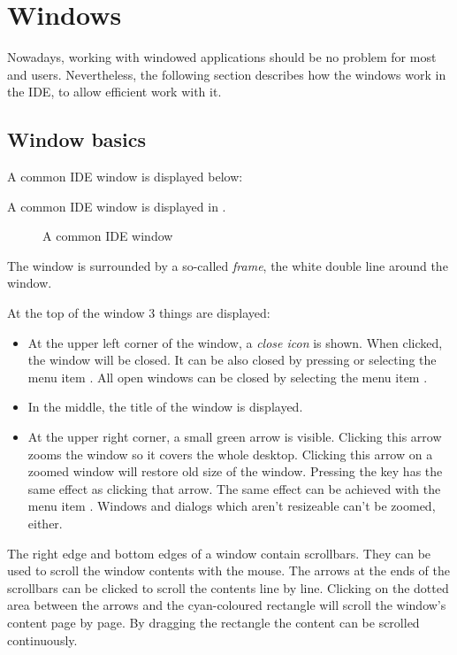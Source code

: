 \section{Windows}
\label{se:windows}
Nowadays, working with windowed applications should be no problem for
most \windows and \linux users. Nevertheless, the following section 
describes how the windows work in the \fpc IDE, to allow efficient 
work with it.
%
%
\subsection{Window basics}
\label{se:windowbasics}
\begin{htmlonly}
A common IDE window is displayed  below:
\end{htmlonly}
\begin{latexonly}
A common IDE window is displayed in .
\begin{figure}
\caption{A common IDE window}
\label{fig:idewin}
\ifpdf
{}
\else
{}
\fi
\end{figure}
\end{latexonly}
The window is surrounded by a so-called \emph{frame}, the white double
line around the window. 

At the top of the window 3 things are displayed:
\begin{itemize}
\item 
At the upper left corner of the window, a \emph{close icon} is shown. 
When clicked, the window will be closed. It can be also closed by
 pressing  or selecting the menu item . 
All open windows can be closed by selecting the menu item 
.
\item In the middle, the title of the window is displayed.
\item At the upper right corner, a small green arrow is visible.
Clicking this arrow zooms the window so it covers the whole desktop. 
Clicking this arrow on a zoomed window will restore old size of the 
window. Pressing the key  has the same effect as clicking 
that arrow. The same effect can be achieved with the menu item 
. 
Windows and dialogs which aren't resizeable can't be zoomed, either.
\end{itemize}

The right edge and bottom edges of a window contain scrollbars.
They can be used to scroll the window contents with the mouse. 
The arrows at the ends of the scrollbars can be clicked to scroll the 
contents line by line. Clicking on the dotted area between the arrows 
and the cyan-coloured rectangle will scroll the window's content 
page by page. By dragging the rectangle the content can be scrolled 
continuously.

